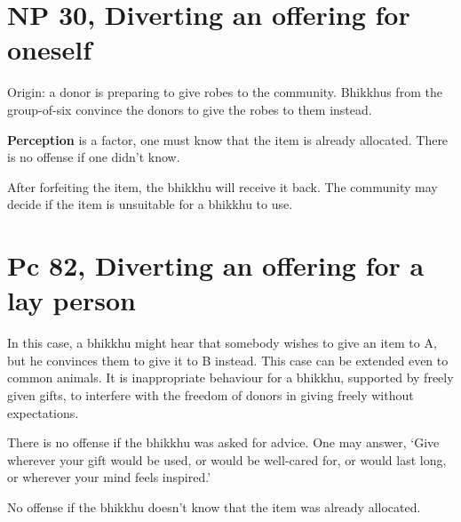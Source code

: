 \section{NP 30, Diverting an offering for oneself}

Origin: a donor is preparing to give robes to the community. Bhikkhus
from the group-of-six convince the donors to give the robes to them
instead.

\textbf{Perception} is a factor, one must know that the item is already
allocated. There is no offense if one didn't know.

After forfeiting the item, the bhikkhu will receive it back. The
community may decide if the item is unsuitable for a bhikkhu to use.

\section{Pc 82, Diverting an offering for a lay person}

In this case, a bhikkhu might hear that somebody wishes to give an item
to A, but he convinces them to give it to B instead. This case can be
extended even to common animals. It is inappropriate behaviour for a
bhikkhu, supported by freely given gifts, to interfere with the freedom
of donors in giving freely without expectations.

There is no offense if the bhikkhu was asked for advice. One may answer,
`Give wherever your gift would be used, or would be well-cared for, or
would last long, or wherever your mind feels inspired.'

No offense if the bhikkhu doesn't know that the item was already
allocated.

